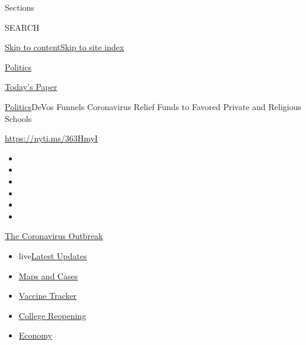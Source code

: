 Sections

SEARCH

\protect\hyperlink{site-content}{Skip to
content}\protect\hyperlink{site-index}{Skip to site index}

\href{https://www.nytimes.com/section/politics}{Politics}

\href{https://myaccount.nytimes.com/auth/login?response_type=cookie\&client_id=vi}{}

\href{https://www.nytimes.com/section/todayspaper}{Today's Paper}

\href{/section/politics}{Politics}\textbar{}DeVos Funnels Coronavirus
Relief Funds to Favored Private and Religious Schools

\url{https://nyti.ms/363HmyI}

\begin{itemize}
\item
\item
\item
\item
\item
\item
\end{itemize}

\href{https://www.nytimes.com/news-event/coronavirus?action=click\&pgtype=Article\&state=default\&region=TOP_BANNER\&context=storylines_menu}{The
Coronavirus Outbreak}

\begin{itemize}
\tightlist
\item
  live\href{https://www.nytimes.com/2020/08/04/world/coronavirus-cases.html?action=click\&pgtype=Article\&state=default\&region=TOP_BANNER\&context=storylines_menu}{Latest
  Updates}
\item
  \href{https://www.nytimes.com/interactive/2020/us/coronavirus-us-cases.html?action=click\&pgtype=Article\&state=default\&region=TOP_BANNER\&context=storylines_menu}{Maps
  and Cases}
\item
  \href{https://www.nytimes.com/interactive/2020/science/coronavirus-vaccine-tracker.html?action=click\&pgtype=Article\&state=default\&region=TOP_BANNER\&context=storylines_menu}{Vaccine
  Tracker}
\item
  \href{https://www.nytimes.com/2020/08/02/us/covid-college-reopening.html?action=click\&pgtype=Article\&state=default\&region=TOP_BANNER\&context=storylines_menu}{College
  Reopening}
\item
  \href{https://www.nytimes.com/live/2020/08/04/business/stock-market-today-coronavirus?action=click\&pgtype=Article\&state=default\&region=TOP_BANNER\&context=storylines_menu}{Economy}
\end{itemize}

